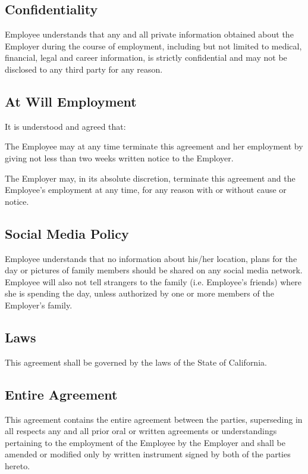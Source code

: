 \documentclass[]{article}
\begin{document}
\subsection*{Confidentiality}

Employee understands that any and all private information obtained about the Employer during the course of employment, including but not limited to medical, financial, legal and career information, is strictly confidential and may not be disclosed to any third party for any reason.  

\subsection*{At Will Employment}

It is understood and agreed that:

The Employee may at any time terminate this agreement and her employment by giving not less than two weeks written notice to the Employer.

The Employer may, in its absolute discretion, terminate this agreement and the Employee's employment at any time, for any reason with or without cause or notice.

\subsection*{Social Media Policy}

Employee understands that no information about his/her location, plans for the day or pictures of family members should be shared on any social media network. Employee will also not tell strangers to the family (i.e.  Employee's friends) where she is spending the day, unless authorized by one or more members of the Employer's family.  

\subsection*{Laws}

This agreement shall be governed by the laws of the State of California.

\subsection*{Entire Agreement}

This agreement contains the entire agreement between the parties, superseding in all respects any and all prior oral or written agreements or understandings pertaining to the employment of the Employee by the Employer and shall be amended or modified only by written instrument signed by both of the parties hereto.  
\end{document}
